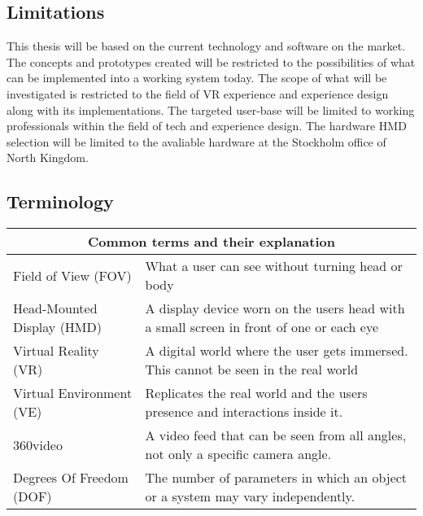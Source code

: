 \subsection{Limitations}
This thesis will be based on the current technology and software on the market. The concepts and prototypes created will be restricted to the possibilities of what can be implemented into a working system today. The scope of what will be investigated is restricted to the field of VR experience and experience design along with its implementations. The targeted user-base will be limited to working professionals within the field of tech and experience design. The hardware HMD selection will be limited to the avaliable hardware at the Stockholm office of North Kingdom.

\subsection{Terminology}
\begin{tabular}{ | p{5.5cm} | p{6.5cm} |  }
	\hline
     	\multicolumn{2}{|c|}{Common terms and their explanation} \\
     	\hline
	Field of View (FOV) & What a user can see without turning head or body \\
    	\hline
     	Head-Mounted Display (HMD) & A display device worn on the users head with a small screen in front of one or each eye \\
    	\hline
     	Virtual Reality (VR) & A digital world where the user gets immersed. This cannot be seen in the real world
			\\
    	\hline
	Virtual Environment (VE) & Replicates the real world and the users presence and interactions inside it.  \\
     	\hline
     	360\degree video & A video feed that can be seen from all angles, not only a specific camera angle. \\
     	\hline
Degrees Of Freedom (DOF) & The number of parameters in which an object or a system may vary independently. \\
\hline
\end{tabular}
